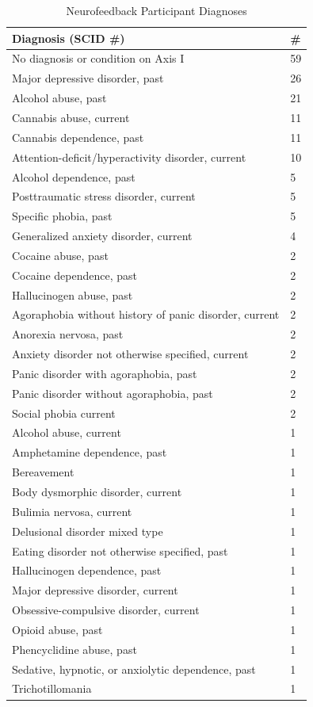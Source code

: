 \begin{table}[h!]
\caption{Neurofeedback Participant Diagnoses}
      \begin{tabular}{ p{7cm} p{0.4cm} }
        \textbf{Diagnosis (SCID \#)} & \textbf{\#} \\ \hline
        No diagnosis or condition on Axis I & 59  \\
        Major depressive disorder, past & 26  \\
        Alcohol abuse, past & 21  \\
        Cannabis abuse, current & 11  \\
        Cannabis dependence, past & 11  \\
        Attention-deficit/hyperactivity disorder, current & 10  \\
        Alcohol dependence, past & 5  \\
        Posttraumatic stress disorder, current & 5  \\
        Specific phobia, past & 5  \\
        Generalized anxiety disorder, current & 4  \\
        Cocaine abuse, past & 2  \\
        Cocaine dependence, past & 2  \\
        Hallucinogen abuse, past & 2  \\
        Agoraphobia without history of panic disorder, current & 2  \\
        Anorexia nervosa, past & 2  \\
        Anxiety disorder not otherwise specified, current & 2  \\
        Panic disorder with agoraphobia, past & 2  \\
        Panic disorder without agoraphobia, past & 2  \\
        Social phobia current & 2  \\
        Alcohol abuse, current & 1  \\
        Amphetamine dependence, past & 1  \\
        Bereavement & 1  \\
        Body dysmorphic disorder, current & 1  \\
        Bulimia nervosa, current & 1  \\
        Delusional disorder mixed type & 1  \\
        Eating disorder not otherwise specified, past & 1  \\
        Hallucinogen dependence, past & 1  \\
        Major depressive disorder, current & 1  \\
        Obsessive-compulsive disorder, current & 1  \\
        Opioid abuse, past  & 1  \\
        Phencyclidine abuse, past & 1  \\
        Sedative, hypnotic, or anxiolytic dependence, past & 1 \\
        Trichotillomania & 1  \\
        \hline
      \end{tabular}
\label{psych}
\end{table}

